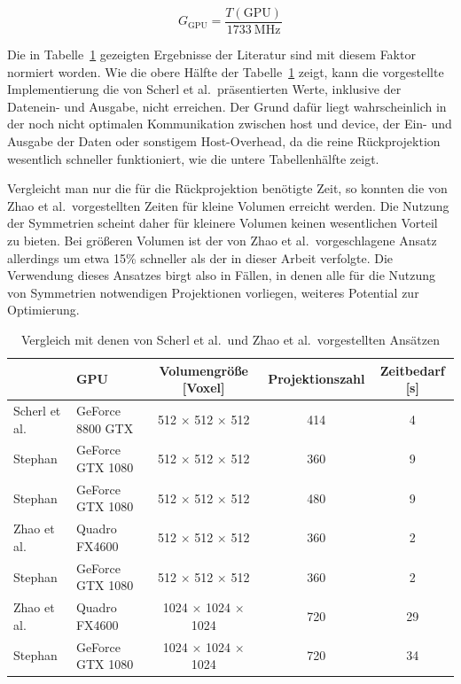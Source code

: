 \begin{equation*}
    G_{\text{GPU}} = \frac{T(\text{GPU})}{1733\ \text{MHz}}
\end{equation*}

Die in Tabelle~\ref{table:paris_vs_scherl_zhao} gezeigten Ergebnisse der Literatur sind mit diesem Faktor normiert
worden. Wie die obere Hälfte der Tabelle~\ref{table:paris_vs_scherl_zhao} zeigt, kann die vorgestellte Implementierung
die von Scherl et al.\ präsentierten Werte, inklusive der Datenein- und Ausgabe, nicht erreichen. Der Grund dafür liegt
wahrscheinlich in der noch nicht optimalen Kommunikation zwischen \gls{host} und \gls{device}, der Ein- und Ausgabe der
Daten oder sonstigem Host-Overhead, da die reine Rückprojektion wesentlich schneller funktioniert, wie die untere
Tabellenhälfte zeigt.

Vergleicht man nur die für die Rückprojektion benötigte Zeit, so konnten die von Zhao et al.\ vorgestellten Zeiten für
kleine Volumen erreicht werden. Die Nutzung der Symmetrien scheint daher für kleinere Volumen keinen wesentlichen
Vorteil zu bieten. Bei größeren Volumen ist der von Zhao et al.\ vorgeschlagene Ansatz allerdings um etwa 15\% schneller
als der in dieser Arbeit verfolgte. Die Verwendung dieses Ansatzes birgt also in Fällen, in denen alle für die Nutzung
von Symmetrien notwendigen Projektionen vorliegen, weiteres Potential zur Optimierung.

\begin{table}
    \centering
    \begin{tabular}{llccc}
        \hline
        & GPU & Volumengröße [Voxel] & Projektionszahl & Zeitbedarf [s]\\
        \hline
        Scherl et al. & GeForce 8800 GTX & 512 $\times$ 512 $\times$ 512 & 414 & 4\\
        Stephan & GeForce GTX 1080 & 512 $\times$ 512 $\times$ 512 & 360 & 9\\
        Stephan & GeForce GTX 1080 & 512 $\times$ 512 $\times$ 512 & 480 & 9\\
        \hline
        Zhao et al. & Quadro FX4600 & 512 $\times$ 512 $\times$ 512 & 360 & 2\\
        Stephan & GeForce GTX 1080 & 512 $\times$ 512 $\times$ 512 & 360 & 2\\
        Zhao et al. & Quadro FX4600 & 1024 $\times$ 1024 $\times$ 1024 & 720 & 29\\
        Stephan & GeForce GTX 1080 & 1024 $\times$ 1024 $\times$ 1024 & 720 & 34\\
        \hline
    \end{tabular}
    \caption{Vergleich mit denen von Scherl et al.\ und Zhao et al.\ vorgestellten Ansätzen}
    \label{table:paris_vs_scherl_zhao}
\end{table}
